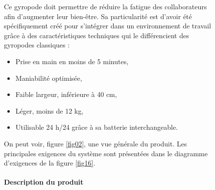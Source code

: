 \begin{figure}[ht!]
 \begin{minipage}{0.7\linewidth}

Ce gyropode doit permettre de réduire la fatigue des collaborateurs afin d'augmenter leur bien-être. Sa particularité est d'avoir été spécifiquement créé pour s'intégrer dans un environnement de travail grâce à des caractéristiques techniques qui le différencient des gyropodes classiques :
\begin{itemize}
 \item Prise en main en moins de 5 minutes,
 \item Maniabilité optimisée,
 \item Faible largeur, inférieure à 40 cm,
 \item Léger, moins de 12 kg,
 \item Utilisable 24 h/24 grâce à sa batterie interchangeable.
\end{itemize}


On peut voir, figure \ref{fig02}, une vue générale du produit. Les principales exigences du système sont présentées dans le diagramme d'exigences de la figure \ref{fig16}.

\paragraph{Description du produit}


\end{minipage}
\end{figure}
